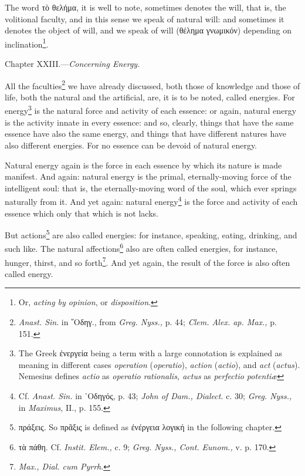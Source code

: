 The word \textgreek{τὸ θελήμα}, it is well to note, sometimes denotes the will, that is, the volitional faculty, and in this sense we speak of natural will: and sometimes it denotes the object of will, and we speak of will (\textgreek{θέλημα γνωμικόν}) depending on inclination\footnote{Or, \emph{acting by opinion}, or \emph{disposition}.}.


Chapter XXIII.—\emph{Concerning Energy.}

All the faculties\footnote{\emph{Anast. Sin}. in \textgreek{῞Οδηγ}., from \emph{Greg. Nyss.,} p. 44; \emph{Clem. Alex. ap. Max., }p. 151.} we have already discussed, both those of knowledge and those of life, both the natural and the artificial, are, it is to be noted, called energies. For energy\footnote{The Greek \textgreek{ἐνεργεία} being a term with a large connotation is explained as meaning in different cases \emph{operation }(\emph{operatio}), \emph{action} (\emph{actio}), and \emph{act} (\emph{actus}). Nemesius defines \emph{actio }as \emph{operatio rationalis, actus }as \emph{perfectio potentiæ}} is the natural force and activity of each essence: or again, natural energy is the activity innate in every essence: and so, clearly, things that have the same essence have also the same energy, and things that have different natures have also different energies. For no essence can be devoid of natural energy.

Natural energy again is the force in each essence by which its nature is made manifest. And again: natural energy is the primal, eternally-moving force of the intelligent soul: that is, the eternally-moving word of the soul, which ever springs naturally from it. And yet again: natural energy\footnote{Cf. \emph{Anast. Sin. }in \textgreek{῾Οδηγός}, p. 43; \emph{John of Dam., Dialect. }c. 30; \emph{Greg. Nyss., }in \emph{Maximus}, II., p. 155.} is the force and activity of each essence which only that which is not lacks.

But actions\footnote{\textgreek{πράξεις}. So \textgreek{πρᾶξις} is defined as \textgreek{ἐνέργεια λογική} in the following chapter.} are also called energies: for instance, speaking, eating, drinking, and such like. The natural affections\footnote{\textgreek{τὰ πάθη}. Cf. \emph{Instit. Elem., }c. 9; \emph{Greg. Nyss., Cont. Eunom., }v. p. 170.} also are often called energies, for instance, hunger, thirst, and so forth\footnote{\emph{Max., Dial. cum Pyrrh}.}. And yet again, the result of the force is also often called energy.

